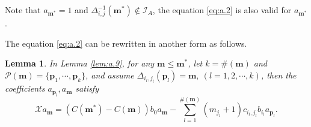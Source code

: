 \documentclass[preprint,12pt]{elsarticle}
\newtheorem{lem}[thm]{Lemma}
\begin{document}
Note that $a_{\mathbf{m}^*} = 1$ and $\Delta_{i,j}^{-1}(\mathbf{m}^*) \not\in\mathcal{I}_A$,  the equation \eqref{eq:a.2} is also valid for $a_{\mathbf{m}^*}$.

The equation \eqref{eq:a.2} can be rewritten in another form as follows.
\begin{lem}
\label{lem:a.8} In Lemma \ref{lem:a.9}, for any $\mathbf{m}\leq \mathbf{m}^*$, let $k=\#(\mathbf{m})$ and $\mathcal{P}(\mathbf{m}) = \{\mathbf{p}_1,\cdots,
\mathbf{p}_k\}$, and assume $\Delta_{{i_l},{j_l}}(\mathbf{p}_l) = \mathbf{m},\
(l = 1,2,\cdots,k)$, then the coefficients $a_{\mathbf{p}_l},
a_{\mathbf{m}}$ satisfy
\begin{equation}
\label{eq:a.3} \mathscr{X} a_{\mathbf{m}} = (C({\mathbf{m}^*}) -
C({\mathbf{m}}))b_0a_{\mathbf{m}} -\sum_{l = 1}^{\#(\mathbf{m})}
(m_{j_l}+1) c_{i_l,j_l} b_{i_l} a_{\mathbf{p}_l}.
\end{equation}
\end{lem}
\end{document}
